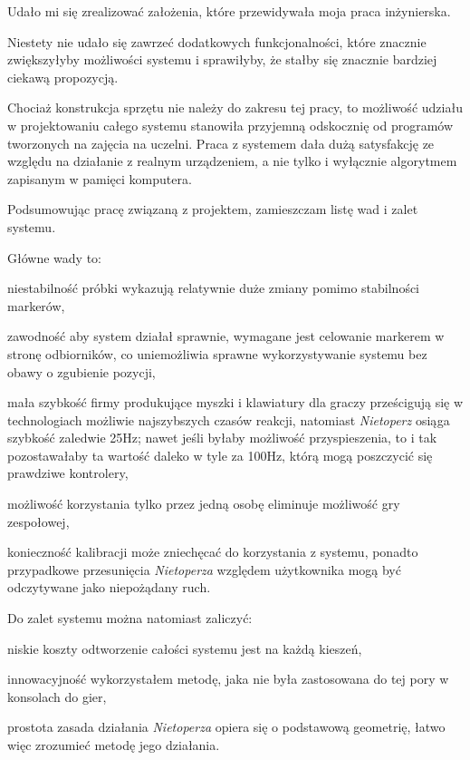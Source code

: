\label{ch:conclusion}

Udało mi się zrealizować założenia, które przewidywała moja praca inżynierska.

Niestety nie udało się zawrzeć dodatkowych funkcjonalności, które znacznie zwiększyłyby możliwości systemu i sprawiłyby, że stałby się znacznie bardziej ciekawą propozycją.

Chociaż konstrukcja sprzętu nie należy do zakresu tej pracy, to możliwość udziału w projektowaniu całego systemu stanowiła przyjemną odskocznię od programów tworzonych na zajęcia na uczelni. Praca z systemem dała dużą satysfakcję ze względu na działanie z realnym urządzeniem, a nie tylko i wyłącznie algorytmem zapisanym w pamięci komputera.


Podsumowując pracę związaną z projektem, zamieszczam listę wad i zalet systemu.

Główne wady to:
\begin{aenumerate}
 \item niestabilność \ppauza próbki wykazują relatywnie duże zmiany pomimo stabilności markerów,
 \item zawodność \ppauza aby system działał sprawnie, wymagane jest celowanie markerem w stronę odbiorników, co uniemożliwia sprawne wykorzystywanie systemu bez obawy o zgubienie pozycji,
 \item mała szybkość \ppauza firmy produkujące myszki i klawiatury dla graczy prześcigują się w technologiach możliwie najszybszych czasów reakcji, natomiast \textsl{Nietoperz} osiąga szybkość zaledwie 25Hz; nawet jeśli byłaby możliwość przyspieszenia, to i tak pozostawałaby ta wartość daleko w tyle za 100Hz, którą mogą poszczycić się prawdziwe kontrolery,
 \item możliwość korzystania tylko przez jedną osobę \ppauza eliminuje możliwość gry zespołowej,
 \item konieczność kalibracji \ppauza może zniechęcać do korzystania z systemu, ponadto przypadkowe przesunięcia \textsl{Nietoperza} względem użytkownika mogą być odczytywane jako niepożądany ruch.
\end{aenumerate}

Do zalet systemu można natomiast zaliczyć:
\begin{aenumerate}
 \item niskie koszty \ppauza odtworzenie całości systemu jest na każdą kieszeń,
 \item innowacyjność \ppauza wykorzystałem metodę, jaka nie była zastosowana do tej pory w konsolach do gier,
 \item prostota \ppauza zasada działania \textsl{Nietoperza} opiera się o podstawową geometrię, łatwo więc zrozumieć metodę jego działania.
\end{aenumerate}

